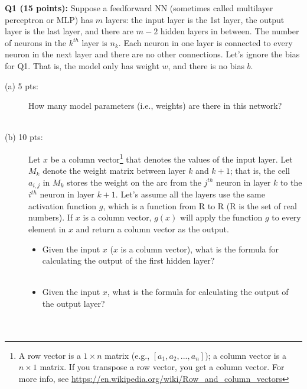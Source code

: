 \documentclass[11pt]{article}
\begin{document}
    
\vspace{0.4in}
\noindent
{\bf Q1 (15 points):} Suppose a feedforward NN
  (sometimes called multilayer perceptron or MLP) has
  $m$ layers: the input layer is the 1st layer, the output layer
  is the last layer, and there are $m-2$ hidden layers in between. 
  The number of neurons in the $k^{th}$ layer is $n_k$.
  Each neuron in one layer is connected to
  every neuron in the next layer and there are no other connections.
  Let's ignore the bias for Q1. That is, the model only has weight $w$,
  and there is no bias $b$.
\begin{description}

\item [(a) 5 pts:] How many model parameters (i.e., weights) are there in
                   this network? \\ \\

\item [(b) 10 pts:] Let $x$ be a column vector\footnote{A row vector
            is a $1 \times n$ matrix
          (e.g., $[a_1, a_2, ..., a_n]$); a column vector is
          a $n \times 1$ matrix. If you transpose a row vector, you get a
          column vector. For more info, see \url{https://en.wikipedia.org/wiki/Row_and_column_vectors}}
         that denotes the values of the
  input layer. Let $M_k$ denote the weight matrix
  between layer $k$ and $k+1$; that is, the cell $a_{i,j}$
  in $M_k$ stores
  the weight on the arc from the $j^{th}$ neuron in layer $k$
  to the $i^{th}$ neuron in layer $k+1$.
  Let's assume all the layers use the same activation function $g$, which
  is a function from R to R (R is the set of real numbers).
  If $x$ is a column vector, $g(x)$
  will apply the function $g$ to every element in $x$ and return a column
  vector as the output.
  
  \begin{itemize}
  \item Given the input $x$ ($x$ is a column vector),
      what is the formula for calculating
      the output of the first hidden layer?  \\ \\

    \item Given the input $x$, what is the formula for calculating
      the output of the output layer? \\ \\ \\
  \end{itemize}
  


\end{description}
\end{document}
